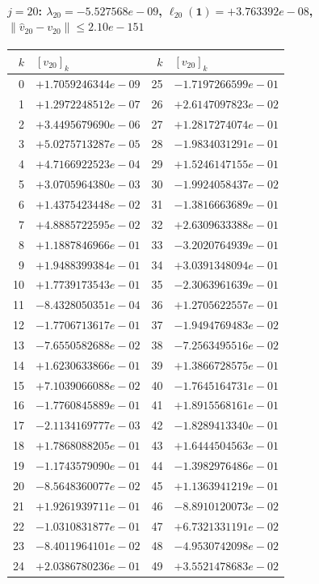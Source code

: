 \documentclass[11pt]{article}
\begin{document}
\paragraph{$j = 20$: $\lambda_{20} = -5.527568e-09$, \quad $\ell_{20}(\mathbf{1}) = +3.763392e-08$, \quad $\|\hat v_{20} - v_{20}\| \leq 2.10e-151$}
\begin{center}
{\footnotesize
\begin{tabular}{r@{\;\;}l@{\quad}r@{\;\;}l}
\toprule
$k$ & $[v_{20}]_k$ & $k$ & $[v_{20}]_k$ \\
\midrule
0 & $+1.7059246344e-09$ & 25 & $-1.7197266599e-01$ \\
1 & $+1.2972248512e-07$ & 26 & $+2.6147097823e-02$ \\
2 & $+3.4495679690e-06$ & 27 & $+1.2817274074e-01$ \\
3 & $+5.0275713287e-05$ & 28 & $-1.9834031291e-01$ \\
4 & $+4.7166922523e-04$ & 29 & $+1.5246147155e-01$ \\
5 & $+3.0705964380e-03$ & 30 & $-1.9924058437e-02$ \\
6 & $+1.4375423448e-02$ & 31 & $-1.3816663689e-01$ \\
7 & $+4.8885722595e-02$ & 32 & $+2.6309633388e-01$ \\
8 & $+1.1887846966e-01$ & 33 & $-3.2020764939e-01$ \\
9 & $+1.9488399384e-01$ & 34 & $+3.0391348094e-01$ \\
10 & $+1.7739173543e-01$ & 35 & $-2.3063961639e-01$ \\
11 & $-8.4328050351e-04$ & 36 & $+1.2705622557e-01$ \\
12 & $-1.7706713617e-01$ & 37 & $-1.9494769483e-02$ \\
13 & $-7.6550582688e-02$ & 38 & $-7.2563495516e-02$ \\
14 & $+1.6230633866e-01$ & 39 & $+1.3866728575e-01$ \\
15 & $+7.1039066088e-02$ & 40 & $-1.7645164731e-01$ \\
16 & $-1.7760845889e-01$ & 41 & $+1.8915568161e-01$ \\
17 & $-2.1134169777e-03$ & 42 & $-1.8289413340e-01$ \\
18 & $+1.7868088205e-01$ & 43 & $+1.6444504563e-01$ \\
19 & $-1.1743579090e-01$ & 44 & $-1.3982976486e-01$ \\
20 & $-8.5648360077e-02$ & 45 & $+1.1363941219e-01$ \\
21 & $+1.9261939711e-01$ & 46 & $-8.8910120073e-02$ \\
22 & $-1.0310831877e-01$ & 47 & $+6.7321331191e-02$ \\
23 & $-8.4011964101e-02$ & 48 & $-4.9530742098e-02$ \\
24 & $+2.0386780236e-01$ & 49 & $+3.5521478683e-02$ \\
\bottomrule
\end{tabular}
}
\end{center}
\end{document}
